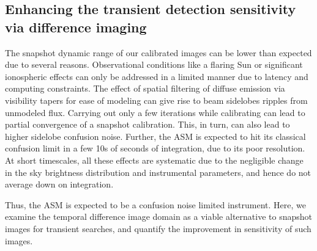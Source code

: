 \documentclass{aa}
\begin{document}
\subsection{\label{sub:Enhancing-the-transient}Enhancing the transient detection
sensitivity via difference imaging} The snapshot dynamic range of our calibrated
images  can  be lower  than  expected  due  to several  reasons.   Observational
conditions like  a flaring  Sun or significant  ionospheric effects can  only be
addressed  in a limited  manner due  to latency  and computing  constraints. The
effect of spatial  filtering of diffuse emission via  visibility tapers for ease
of  modeling  can give  rise  to beam  sidelobes  ripples  from unmodeled  flux.
Carrying  out  only a  few  iterations while  calibrating  can  lead to  partial
convergence of  a snapshot calibration. This,  in turn, can also  lead to higher
sidelobe  confusion noise. Further,  the ASM  is expected  to hit  its classical
confusion  limit in  a  few  10s of  seconds  of integration,  due  to its  poor
resolution. At  short timescales,  all these effects  are systematic due  to the
negligible  change   in  the   sky  brightness  distribution   and  instrumental
parameters, and hence do not average down on integration.

Thus, the ASM is expected to  be a confusion noise limited instrument.  Here, we
examine the temporal difference image domain as a viable alternative to snapshot
images for  transient searches, and  quantify the improvement in  sensitivity of
such images.
\end{document}
